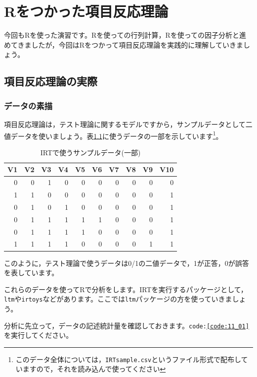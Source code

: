 \documentclass{ltjsbook}
\begin{document}
\chapter{Rをつかった項目反応理論}
\label{x11_IRTonR}

今回もRを使った演習です。Rを使っての行列計算，Rを使っての因子分析と進めてきましたが，今回はRをつかって項目反応理論を実践的に理解していきましょう。

\section{項目反応理論の実際}
\subsection{データの素描}
項目反応理論は，テスト理論に関するモデルですから，サンプルデータとして二値データを使いましょう。表\ref{tbl::11_01}に使うデータの一部を示しています\footnote{このデータ全体については，\texttt{IRTsample.csv}というファイル形式で配布していますので，それを読み込んで使ってください}。
\begin{table}[ht]
	\caption{IRTで使うサンプルデータ(一部)}
	\centering
	\begin{tabular}[t]{rrrrrrrrrr}
		\hline
		V1 & V2 & V3 & V4 & V5 & V6 & V7 & V8 & V9 & V10 \\
		\hline
		0  & 0  & 1  & 0  & 0  & 0  & 0  & 0  & 0  & 0   \\
		1  & 1  & 0  & 0  & 0  & 0  & 0  & 0  & 0  & 1   \\
		0  & 1  & 0  & 1  & 0  & 0  & 0  & 0  & 0  & 1   \\
		0  & 1  & 1  & 1  & 1  & 1  & 0  & 0  & 0  & 1   \\
		0  & 1  & 1  & 1  & 1  & 0  & 0  & 0  & 0  & 1   \\
		1  & 1  & 1  & 1  & 0  & 0  & 0  & 0  & 1  & 1   \\
		\hline
	\end{tabular}
	\label{tbl::11_01}
\end{table}

このように，テスト理論で使うデータは0/1の二値データで，1が正答，0が誤答を表しています。

これらのデータを使ってRで分析をします。IRTを実行するパッケージとして，\texttt{ltm}\textcite{ltm}や\texttt{irtoys}\textcite{partchev2017package}などがあります。ここでは\texttt{ltm}パッケージの方を使っていきましょう。

分析に先立って，データの記述統計量を確認しておきます。\texttt{code:\ref{code:11_01}}を実行してください。
\end{document}
